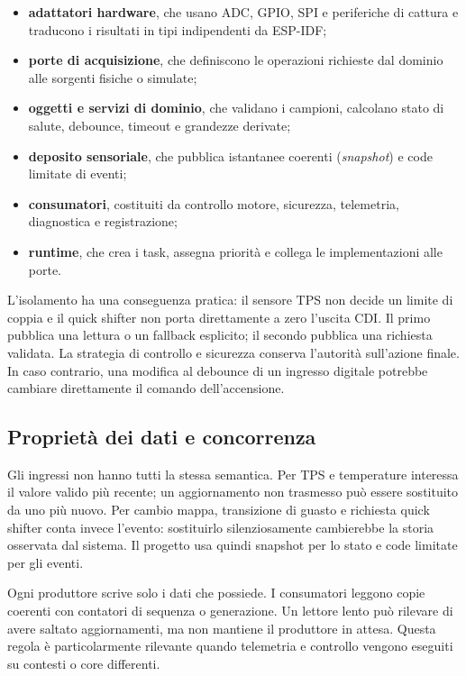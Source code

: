 \documentclass{article}
\begin{document}
\begin{itemize}
    \item \textbf{adattatori hardware}, che usano ADC, GPIO, SPI e periferiche di
          cattura e traducono i risultati in tipi indipendenti da ESP-IDF;
    \item \textbf{porte di acquisizione}, che definiscono le operazioni richieste
          dal dominio alle sorgenti fisiche o simulate;
    \item \textbf{oggetti e servizi di dominio}, che validano i campioni,
          calcolano stato di salute, debounce, timeout e grandezze derivate;
    \item \textbf{deposito sensoriale}, che pubblica istantanee coerenti
          (\emph{snapshot}) e code
          limitate di eventi;
    \item \textbf{consumatori}, costituiti da controllo motore, sicurezza,
          telemetria, diagnostica e registrazione;
    \item \textbf{runtime}, che crea i task, assegna priorità e collega le
          implementazioni alle porte.
\end{itemize}

L'isolamento ha una conseguenza pratica: il sensore TPS non decide un limite di
coppia e il quick shifter non porta direttamente a zero l'uscita CDI. Il primo
pubblica una lettura o un fallback esplicito; il secondo pubblica una richiesta
validata. La strategia di controllo e sicurezza conserva l'autorità sull'azione
finale. In caso contrario, una modifica al debounce di un ingresso digitale
potrebbe cambiare direttamente il comando dell'accensione.

\subsection{Proprietà dei dati e concorrenza}

Gli ingressi non hanno tutti la stessa semantica. Per TPS e temperature interessa
il valore valido più recente; un aggiornamento non trasmesso può essere
sostituito da uno più nuovo. Per cambio mappa, transizione di guasto e richiesta
quick shifter conta invece l'evento: sostituirlo silenziosamente cambierebbe la
storia osservata dal sistema. Il progetto usa quindi snapshot per lo stato e
code limitate per gli eventi.

Ogni produttore scrive solo i dati che possiede. I consumatori leggono copie
coerenti con contatori di sequenza o generazione. Un lettore lento può rilevare
di avere saltato aggiornamenti, ma non mantiene il produttore in attesa. Questa
regola è particolarmente rilevante quando telemetria e controllo vengono
eseguiti su contesti o core differenti.
\end{document}
